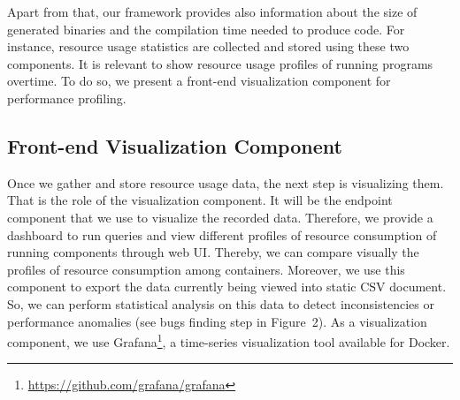 Apart from that, our framework provides also information about the size of generated binaries and the compilation time needed to produce code.
For instance, resource usage statistics are collected and stored using these two components. It is relevant to show resource usage profiles of running programs overtime. To do so, we present a front-end visualization component for performance profiling. 

\subsection{Front-end Visualization Component}
Once we gather and store resource usage data, the next step is visualizing them. That is the role of the visualization component. It will be the endpoint component that we use to visualize the recorded data. Therefore, we provide a dashboard to run queries and view different profiles of resource consumption of running components through web UI. Thereby, we can compare visually the profiles of resource consumption among containers. Moreover, we use this component to export the data currently being viewed into static CSV document. So, we can perform statistical analysis on this data to detect inconsistencies or performance anomalies (see bugs finding step in Figure~2).
As a visualization component, we use Grafana\footnote{\url{https://github.com/grafana/grafana}}, a time-series visualization tool available for Docker. 